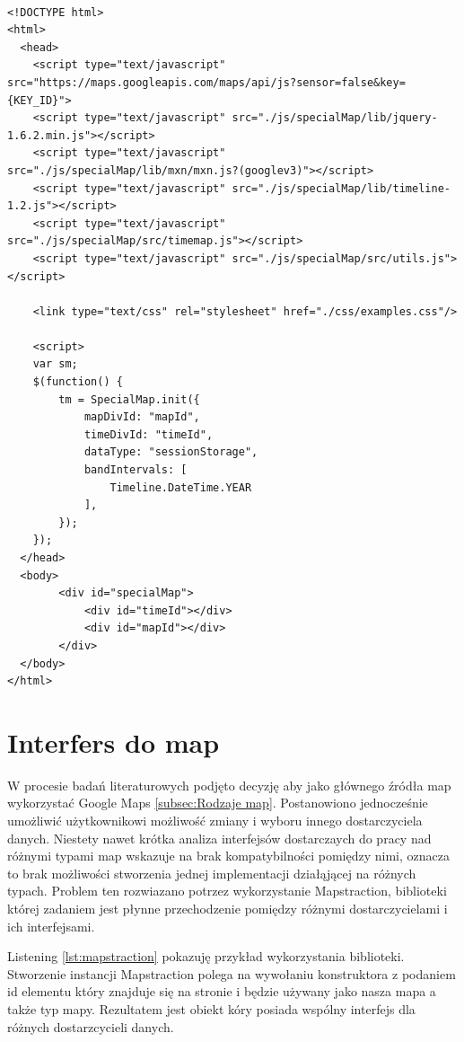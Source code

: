 \lstset{language=JavaScript}
\begin{lstlisting}[label={lst:minconf},caption={Minimalna konfiguracja.}]

<!DOCTYPE html>
<html>
  <head>
    <script type="text/javascript" src="https://maps.googleapis.com/maps/api/js?sensor=false&key={KEY_ID}">
    <script type="text/javascript" src="./js/specialMap/lib/jquery-1.6.2.min.js"></script>
    <script type="text/javascript" src="./js/specialMap/lib/mxn/mxn.js?(googlev3)"></script>
    <script type="text/javascript" src="./js/specialMap/lib/timeline-1.2.js"></script>
    <script type="text/javascript" src="./js/specialMap/src/timemap.js"></script>
    <script type="text/javascript" src="./js/specialMap/src/utils.js"></script>

    <link type="text/css" rel="stylesheet" href="./css/examples.css"/>

    <script>
    var sm;
    $(function() {
        tm = SpecialMap.init({
            mapDivId: "mapId",
            timeDivId: "timeId",
            dataType: "sessionStorage",
            bandIntervals: [
	            Timeline.DateTime.YEAR
	        ],
        });
    });
  </head>
  <body>
        <div id="specialMap">
            <div id="timeId"></div>
            <div id="mapId"></div>
        </div>
  </body>
</html>
\end{lstlisting}


\section{Interfers do map}
\label{sec:mxn}

W procesie badań literaturowych podjęto decyzję aby jako głównego źródła map wykorzystać Google Maps \ref{subsec:Rodzaje map}. Postanowiono jednocześnie umożliwić użytkownikowi możliwość zmiany i wyboru innego dostarczyciela danych. Niestety nawet krótka analiza interfejsów dostarczaych do pracy nad różnymi typami map wskazuje na brak kompatybilności pomiędzy nimi, oznacza to brak możliwości stworzenia jednej implementacji działąjącej na różnych typach. Problem ten rozwiazano potrzez wykorzystanie Mapstraction, biblioteki której zadaniem jest płynne przechodzenie pomiędzy różnymi dostarczycielami i ich interfejsami.

Listening \ref{lst:mapstraction} pokazuję przykład wykorzystania biblioteki. Stworzenie instancji Mapstraction polega na wywołaniu konstruktora z podaniem id elementu który znajduje się na stronie i będzie używany jako nasza mapa a także typ mapy. Rezultatem jest obiekt kóry posiada wspólny interfejs dla różnych dostarzcycieli danych.

